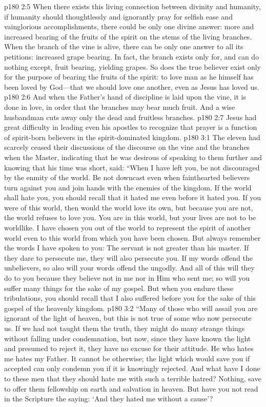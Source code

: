 \vs p180 2:5 When there exists this living connection between divinity and humanity, if humanity should thoughtlessly and ignorantly pray for selfish ease and vainglorious accomplishments, there could be only one divine answer: more and increased bearing of the fruits of the spirit on the stems of the living branches. When the branch of the vine is alive, there can be only one answer to all its petitions: increased grape bearing. In fact, the branch exists only for, and can do nothing except, fruit bearing, yielding grapes. So does the true believer exist only for the purpose of bearing the fruits of the spirit: to love man as he himself has been loved by God---that we should love one another, even as Jesus has loved us.
\vs p180 2:6 And when the Father’s hand of discipline is laid upon the vine, it is done in love, in order that the branches may bear much fruit. And a wise husbandman cuts away only the dead and fruitless branches.
\vs p180 2:7 Jesus had great difficulty in leading even his apostles to recognize that prayer is a function of spirit\hyp{}born believers in the spirit\hyp{}dominated kingdom.\plusone
{}
\vs p180 3:1 The eleven had scarcely ceased their discussions of the discourse on the vine and the branches when the Master, indicating that he was desirous of speaking to them further and knowing that his time was short, said: “When I have left you, be not discouraged by the enmity of the world. Be not downcast even when fainthearted believers turn against you and join hands with the enemies of the kingdom. If the world shall hate you, you should recall that it hated me even before it hated you. If you were of this world, then would the world love its own, but because you are not, the world refuses to love you. You are in this world, but your lives are not to be worldlike. I have chosen you out of the world to represent the spirit of another world even to this world from which you have been chosen. But always remember the words I have spoken to you: The servant is not greater than his master. If they dare to persecute me, they will also persecute you. If my words offend the unbelievers, so also will your words offend the ungodly. And all of this will they do to you because they believe not in me nor in Him who sent me; so will you suffer many things for the sake of my gospel. But when you endure these tribulations, you should recall that I also suffered before you for the sake of this gospel of the heavenly kingdom.
\vs p180 3:2 \textcolor{ubdarkred}{“Many of those who will assail you are ignorant of the light of heaven, but this is not true of some who now persecute us. If we had not taught them the truth, they might do many strange things without falling under condemnation, but now, since they have known the light and presumed to reject it, they have no excuse for their attitude. He who hates me hates my Father. It cannot be otherwise; the light which would save you if accepted can only condemn you if it is knowingly rejected. And what have I done to these men that they should hate me with such a terrible hatred? Nothing, save to offer them fellowship on earth and salvation in heaven. But have you not read in the Scripture the saying: ‘And they hated me without a cause’?}
